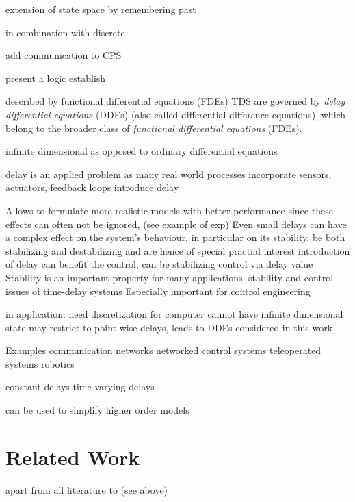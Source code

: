     extension of state space by remembering past

    in combination with discrete

    add communication to CPS

    present a logic 
    establish

    \cite{Richard2003TDSs}
    described by functional differential equations (FDEs)
    TDS are governed by \emph{delay differential equations} (DDEs) (also called differential-difference equations), which belong to the broader class of \emph{functional differential equations} (FDEs).
    
    infinite dimensional
    as opposed to ordinary differential equations
    
    delay is an applied problem
    as many real world processes incorporate
    sensors, actuators, feedback loops
    introduce delay


    Allows to formulate more realistic models with better performance
    since these effects can often not be ignored,
    (see example of exp)
    Even small delays can have a complex effect on the system's behaviour, in particular on its stability.
    be both stabilizing and destabilizing
    and are hence of special practial interest
    introduction of delay can benefit the control, can be stabilizing
    control via delay value
    Stability is an important property for many applications.
    stability and control issues of time-delay systems
    Especially important for control engineering

    in application: need discretization for computer
    cannot have infinite dimensional state
    may restrict to point-wise delays, leads to DDEs considered in this work

    Examples
    communication networks
    networked control systems
    teleoperated systems
    robotics
    \cite{Gu03TimeDelaySys} %


    constant delays
    time-varying delays

    can be used to simplify higher order models
    

    \section{Related Work}
        apart from all literature to \dL (see above)
        \cite{Huang16BoundedVerificationNNDS}
